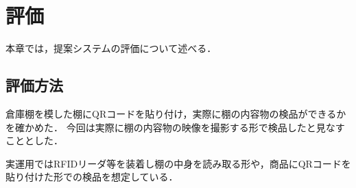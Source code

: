 \chapter{評価}
\label{evaluation}
本章では，提案システムの評価について述べる．

\section{評価方法}
倉庫棚を模した棚にQRコードを貼り付け，実際に棚の内容物の検品ができるかを確かめた．
今回は実際に棚の内容物の映像を撮影する形で検品したと見なすこととした．

実運用ではRFIDリーダ等を装着し棚の中身を読み取る形や，商品にQRコードを貼り付けた形での検品を想定している．



